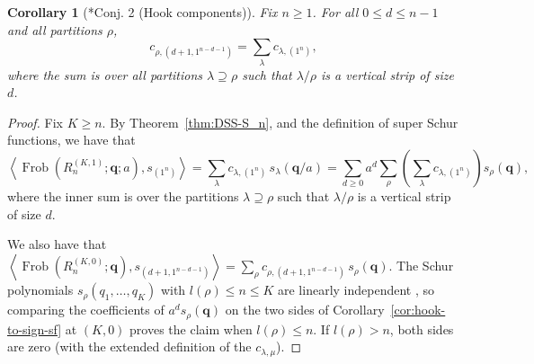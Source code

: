 \documentclass[11pt, reqno]{amsart}
\newtheorem{corollary}[theorem]{Corollary}
\theoremstyle{definition}
\theoremstyle{remark}
\numberwithin{equation}{section}
\newcommand{\0}{\emptyset}
\DeclareMathOperator{\Frob}{Frob}
\begin{document}
\begin{corollary}[\cite{BergeronOPAC}*{Conj. 2 (Hook components)}]\label{cor:hook-components} 
Fix $n\geq1$. 
For all $0\leq d\leq n-1$ and all partitions $\rho$,
\begin{equation}\label{eq:hook-components}
    c_{\rho,(d+1,1^{n-d-1})} = \sum_{\lambda} c_{\lambda,(1^n)},
\end{equation}
where the sum is over all partitions $\lambda\supseteq\rho$ such that $\lambda/\rho$ is a vertical strip of size $d$.
\end{corollary}

\begin{proof}
    Fix $K\geq n$.
    By Theorem~\ref{thm:DSS-S_n}, and the definition of super Schur functions, we have that
    \begin{equation*}
            \left\langle 
            \Frob \left(R_n^{(K,1)}; \mathbf{q}; a\right), s_{(1^n)} 
            \right\rangle = 
            \sum_{\lambda} c_{\lambda,(1^n)}\, s_\lambda(\mathbf{q}/a) = 
            \sum_{d\geq0} a^d \sum_{\rho}\left(\sum_{\lambda} c_{\lambda,(1^n)}\right) 
            s_\rho(\mathbf{q}), 
    \end{equation*}
    where the inner sum is over the partitions $\lambda\supseteq\rho$ such that $\lambda/\rho$ is a vertical strip of size $d$.

    We also have that $\left\langle \Frob \left(R_n^{(K,0)}; \mathbf{q}\right), 
    s_{(d+1,1^{n-d-1})} \right\rangle = 
    \sum_\rho c_{\rho,(d+1,1^{n-d-1})}\,s_\rho(\mathbf{q})$. 
    The Schur polynomials $s_\rho(q_1,\ldots,q_K)$ with $l(\rho)\leq n\leq K$ are linearly independent \cite{Macdonald}, so comparing the coefficients of $a^d s_\rho(\mathbf{q})$ on the two sides of Corollary~\ref{cor:hook-to-sign-sf} at $(K,0)$ proves the claim when $l(\rho)\leq n$. 
    If $l(\rho)>n$, both sides are zero (with the extended definition of the $c_{\lambda,\mu}$).
\end{proof}
\end{document}
